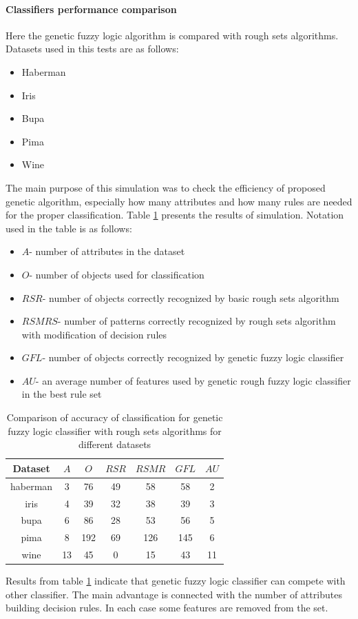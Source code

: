 \paragraph{Classifiers performance comparison}
Here the genetic fuzzy logic algorithm is compared with rough sets algorithms.
Datasets used in this tests are as follows:
\begin{itemize}
    \item Haberman
    \item Iris
    \item Bupa
    \item Pima
    \item Wine
\end{itemize}
The main purpose of this simulation was to check the efficiency of proposed
genetic algorithm, especially how many attributes and how many rules are needed 
for the proper classification. Table \ref{tab:genetic_fuzzy_results} presents
the results of simulation. Notation used in the table is as follows:
\begin{itemize}
    \item $A$- number of attributes in the dataset
    \item $O$- number of objects used for classification
    \item $RSR$- number of objects correctly recognized by basic rough sets algorithm
    \item $RSMRS$- number of patterns correctly recognized by rough sets algorithm
        with modification of decision rules
    \item $GFL$- number of objects correctly recognized by genetic fuzzy logic
        classifier
    \item $AU$- an average number of features used by genetic rough fuzzy logic classifier
        in the best rule set
\end{itemize}
\begin{table}[H]
    \caption{Comparison of accuracy of classification for genetic fuzzy logic classifier with
    rough sets algorithms for different datasets}
    \centering
    \begin{tabular}{|c|c|c|c|c|c|c|}
        \hline
        Dataset & $A$ & $O$ & $RSR$ & $RSMR$ & $GFL$ & $AU$\\ 
        \hline \hline
        haberman& 3&	76&	49&	58&	58 & 2 \\ \hline
        iris&	4&	39&	32&	38&	39 & 3\\ \hline
        bupa&  	6&	86&	28&	53&	56 & 5\\ \hline 
        pima&   8&	192&	69&	126& 145 & 6 \\ \hline
        wine& 13&	45&	0&	15&	43 & 11\\ \hline
    \end{tabular}
    \label{tab:genetic_fuzzy_results}
\end{table}
Results from table \ref{tab:genetic_fuzzy_results} indicate that genetic fuzzy
logic classifier can compete with other classifier. The main advantage is
connected with the number of attributes building decision rules. In each case
some features are removed from the set.

